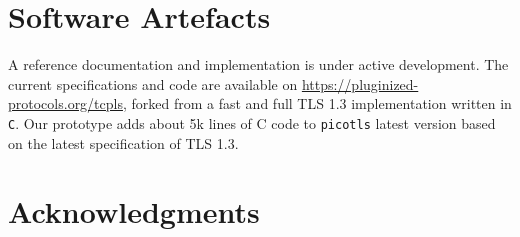 %


\section*{Software Artefacts}

A \tcpls reference documentation and implementation is under active development. The
current specifications and code are available on
\url{https://pluginized-protocols.org/tcpls}, forked from a fast and
full TLS 1.3 implementation written in \texttt{C}. Our \tcpls prototype adds
about 5k lines of C code to \texttt{picotls} latest version based on the latest
specification of TLS 1.3.

\section*{Acknowledgments}
